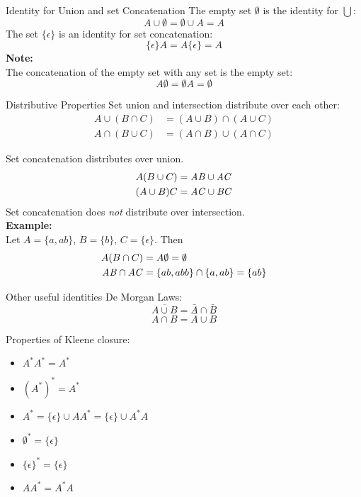 \begin{slide}[bm=,toc=]{Identity for Union and set Concatenation}
The empty set $\emptyset$ is the identity for $\bigcup$:
\pause
\[
A\cup \emptyset = \emptyset \cup A = A
\]
\pause
The set $\{\epsilon\}$ is an identity for set concatenation:
\pause
\[
\{\epsilon\}A = A\{\epsilon\} = A
\]
\pause
\textbf{Note:} \\
The concatenation of the empty set with any set is the empty set:
\pause
\[
A\emptyset = {\emptyset}A = \emptyset
\]
\end{slide}

\begin{slide}[bm=,toc=]{Distributive Properties}
Set union and intersection distribute over each other:
\pause
\begin{align*}
   A \cup (B \cap C) &= (A\cup B)\cap(A \cup C)\\
   A \cap (B \cup C) &= (A\cap B)\cup(A \cap C)
\end{align*}

\pause
Set concatenation distributes over union. 
\pause
\begin{align*}
    A(B\cup C) &= \mathit{AB} \cup \mathit{AC}\\
    (A\cup B)C &= \mathit{AC} \cup \mathit{BC}
\end{align*}
\pause
Set concatenation does \emph{not} distribute over intersection. \\

\pause
\textbf{Example:}~\\
Let $A = \{a,ab\}$, $B = \{b\}$, $C = \{\epsilon\}$. Then
\vspace{-3mm}
\pause
\begin{align*}
       A(B\cap C)             &= A\emptyset               = \emptyset \\
       \mathit{AB} \cap \mathit{AC} &= \{ab,abb\} \cap \{a,ab\} = \{ab\}
\end{align*}
\end{slide}

\begin{slide}[bm=,toc=]{Other useful identities}
De Morgan Laws:
\pause
\[
\overline{A \cup B} = \bar{A} \cap \bar{B}  
\]
\[
\overline{A \cap B} = \bar{A} \cup \bar{B}  
\]

\pause
Properties of Kleene closure:
\begin{itemize}
\item<4-> $A^*A^* = A^*$
\item<5-> $(A^*)^* = A^*$
\item<6-> $A^* = \{\epsilon\} \cup AA^* = \{\epsilon\}\cup A^*A $
\item<7-> $\emptyset^* = \{\epsilon\}$ 
\item<8-> $\{\epsilon\}^* = \{\epsilon\}$ 
\item<9-> $AA^* = A^*A$ 
\end{itemize}
\end{slide}
